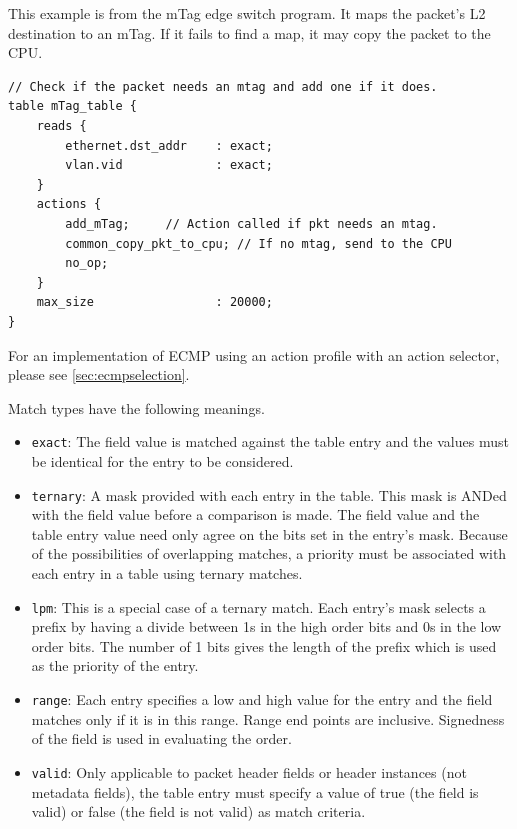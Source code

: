 \documentclass[12pt]{article}
\begin{document}
This example is from the mTag edge switch program.  It maps the packet's 
L2 destination to an mTag. If it fails to find a map, it may copy the packet 
to the CPU.

\begin{lstlisting}[keywords={},frame=single,escapechar=\@]
// Check if the packet needs an mtag and add one if it does.
table mTag_table {
    reads {
        ethernet.dst_addr    : exact;
        vlan.vid             : exact;
    }
    actions {
        add_mTag;     // Action called if pkt needs an mtag.
        common_copy_pkt_to_cpu; // If no mtag, send to the CPU
        no_op;
    }
    max_size                 : 20000;
}
\end{lstlisting}

For an implementation of ECMP using an action profile with an action selector,
please see \ref{sec:ecmpselection}.


Match types have the following meanings.

\begin{itemize}
\item
\texttt{exact}: The field value is matched against the table entry and the values 
must be identical for the entry to be considered.
\item
\texttt{ternary}:  A mask provided with each entry in the table. This mask is ANDed 
with the field value before a comparison is made.  The field value and the 
table entry value need only agree on the bits set in the entry's mask.  Because 
of the possibilities of overlapping matches, a priority must be associated 
with each entry in a table using ternary matches.
\item
\texttt{lpm}:  This is a special case of a ternary match. Each entry's mask selects 
a prefix by having a divide between 1s in the high order bits and 0s in the 
low order bits. The number of 1 bits gives the length of the prefix which 
is used as the priority of the entry.
\item
\texttt{range}: Each entry specifies a low and high value for the entry and the field 
matches only if it is in this range. Range end points are inclusive. Signedness 
of the field is used in evaluating the order.
\item
\texttt{valid}: Only applicable to packet header fields or header instances (not metadata 
fields), the table entry must specify a value of true (the field is valid) 
or false (the field is not valid) as match criteria.
\end{itemize}
\end{document}

